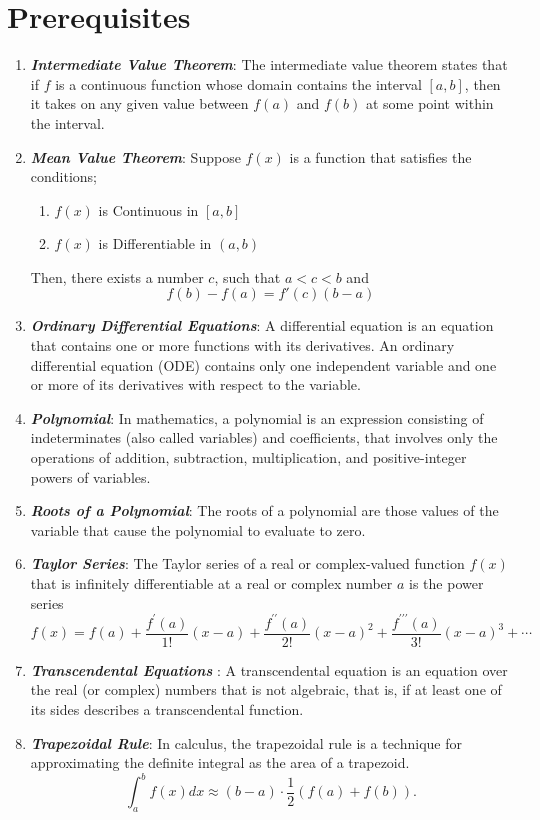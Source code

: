 \documentclass[12pt,a4paper,oneside]{book}
\begin{document}
\chapter{Prerequisites}
\begin{enumerate}
	\item \textbf{\textit{Intermediate Value Theorem}}: The intermediate value theorem states that if $f$ is a continuous function whose domain contains the interval $[a, b]$, then it takes on any given value between $f(a)$ and $f(b)$ at some point within the interval.
	\item \textbf{\textit{Mean Value Theorem}}:	Suppose $f(x)$ is a function that satisfies the conditions;\begin{enumerate}
		\item $f(x)$ is Continuous in $[a, b]$
		\item $f(x)$ is Differentiable in $(a, b)$
	\end{enumerate}
	Then, there exists a number $c$, such that $a<c<b$ and
	$$f(b)-f(a)=f'(c)(b-a)$$
	\item\textbf{\textit{Ordinary Differential Equations}}: A differential equation is an equation that contains one or more functions with its derivatives. An ordinary differential equation (ODE) contains only one independent variable and one or more of its derivatives with respect to the variable.
	\item \textbf{\textit{Polynomial}}: In mathematics, a polynomial is an expression consisting of indeterminates (also called variables) and coefficients, that involves only the operations of addition, subtraction, multiplication, and positive-integer powers of variables.
	\item \textbf{\textit{Roots of a Polynomial}}: The roots of a polynomial are those values of the variable that cause the polynomial to evaluate to zero.
	\item \textbf{\textit{Taylor Series}}: The Taylor series of a real or complex-valued function $f(x)$ that is infinitely differentiable at a real or complex number $a$ is the power series
	$$f(x)=f(a)+\frac{f^{\prime}(a)}{1 !}(x-a)+\frac{f^{\prime \prime}(a)}{2 !}(x-a)^2+\frac{f^{\prime \prime \prime}(a)}{3 !}(x-a)^3+\cdots
	$$
	\item \textbf{\textit{Transcendental Equations }}: A transcendental equation is an equation over the real (or complex) numbers that is not algebraic, that is, if at least one of its sides describes a transcendental function.
	\item \textbf{\textit{Trapezoidal Rule}}: In calculus, the trapezoidal rule is a technique for approximating the definite integral as the area of a trapezoid.
	$$
	\int_a^b f(x) d x \approx(b-a) \cdot \frac{1}{2}(f(a)+f(b)) .
	$$
\end{enumerate}
\mainmatter
\pagestyle{plain}
\end{document}
